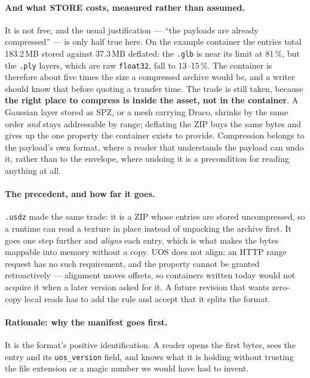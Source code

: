 \documentclass[11pt,a4paper]{article}
\newcommand{\code}[1]{\texttt{\small #1}}
\begin{document}
\paragraph{And what STORE costs, measured rather than assumed.} It is not free, and the
usual justification --- ``the payloads are already compressed'' --- is only half true here.
On the example container the entries total 183.2\,MB stored against 37.3\,MB deflated: the
\code{.glb} is near its limit at 81\,\%, but the \code{.ply} layers, which are raw
\code{float32}, fall to 13--15\,\%. The container is therefore about five times the size a
compressed archive would be, and a writer should know that before quoting a transfer time. The trade is still taken, because \textbf{the right place to compress is inside the asset,
not in the container}. A Gaussian layer stored as SPZ, or a mesh carrying Draco, shrinks by
the same order \emph{and} stays addressable by range; deflating the ZIP buys the same bytes
and gives up the one property the container exists to provide. Compression belongs to the
payload's own format, where a reader that understands the payload can undo it, rather than
to the envelope, where undoing it is a precondition for reading anything at all.

\paragraph{The precedent, and how far it goes.} \code{.usdz} made the same trade: it is a
ZIP whose entries are stored uncompressed, so a runtime can read a texture in place instead
of unpacking the archive first. It goes one step further and \emph{aligns} each entry,
which is what makes the bytes mappable into memory without a copy. UOS does not align: an
HTTP range request has no such requirement, and the property cannot be granted
retroactively --- alignment moves offsets, so containers written today would not acquire it
when a later version asked for it. A future revision that wants zero-copy local reads has
to add the rule and accept that it splits the format.

\paragraph{Rationale: why the manifest goes first.} It is the format's positive
identification. A reader opens the first bytes, sees the entry and its \code{uos\_version}
field, and knows what it is holding without trusting the file extension or a magic number
we would have had to invent.
\end{document}
